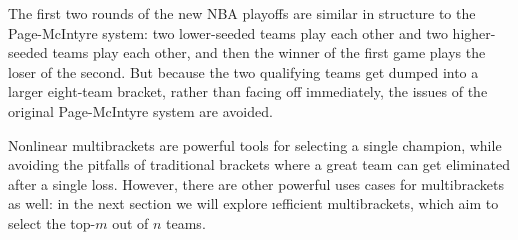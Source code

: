 {    

    The first two rounds of the new NBA playoffs are similar in structure to the Page-McIntyre system: two lower-seeded teams play each other and two higher-seeded teams play each other, and then the winner of the first game plays the loser of the second. But because the two qualifying teams get dumped into a larger eight-team bracket, rather than facing off immediately, the issues of the original Page-McIntyre system are avoided.

    Nonlinear multibrackets are powerful tools for selecting a single champion, while avoiding the pitfalls of traditional brackets where a great team can get eliminated after a single loss. However, there are other powerful uses cases for multibrackets as well: in the next section we will explore \i{efficient} multibrackets, which aim to select the top-$m$ out of $n$ teams.
}